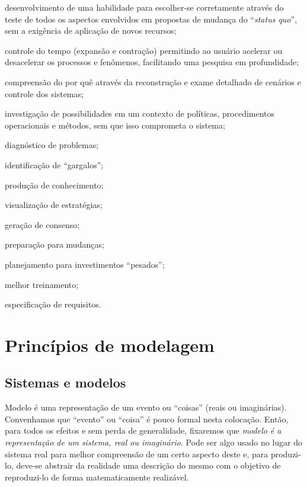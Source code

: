 \documentclass[a4paper,12pt,oneside,onecolumn]{uerj/uerj}
\begin{document}
\begin{lcircp}
    \item desenvolvimento de uma habilidade para escolher-se corretamente através do teste de todos os aspectos envolvidos em propostas de mudança do ``\emph{status quo}'', sem a exigência de aplicação de novos recursos;
    \item controle do tempo (expansão e contração) permitindo ao usuário acelerar ou desacelerar os processos e fenômenos, facilitando uma pesquisa em profundidade;
    \item compreensão do por quê através da reconstrução e exame detalhado de cenários e controle dos sistemas;
    \item investigação de possibilidades em um contexto de políticas, procedimentos operacionais e métodos, sem que isso comprometa o sistema;
    \item diagnóstico de problemas;
    \item identificação de ``gargalos'';
    \item produção de conhecimento;
    \item visualização de estratégias;
    \item geração de consenso;
    \item preparação para mudanças;
    \item planejamento para investimentos ``pesados'';
    \item melhor treinamento;
    \item especificação de requisitos.
\end{lcircp}

\chapter{Princípios de modelagem}

\section{Sistemas e modelos}

Modelo é uma representação de um evento ou ``coisas'' (reais ou imaginárias). Convenhamos que ``evento'' ou ``coisa'' é pouco formal nesta colocação. Então, para todos os efeitos e sem perda de generalidade, fixaremos que \emph{modelo é a representação de um sistema, real ou imaginário}. Pode ser algo usado no lugar do sistema real para melhor compreensão de um certo aspecto deste e, para produzi-lo, deve-se abstrair da realidade uma descrição do mesmo com o objetivo de reproduzi-lo de forma matematicamente realizável. 
\end{document}
